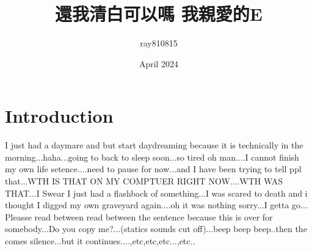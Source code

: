 \documentclass{article}
\title{還我清白可以嗎 我親愛的E}
\author{ray810815 }
\date{April 2024}
\begin{document}
\maketitle

\section{Introduction}
I just had a daymare and but start daydreaming because it is technically in the morning...haha...going to back to sleep soon...so tired oh man....I cannot finish my own life setence....need to pause for now...and I have been trying to tell
ppl that...WTH IS THAT ON MY COMPTUER RIGHT NOW....WTH WAS THAT...I Swear I just had a flashback of something...I was scared to death and i thought I digged my own graveyard  again....oh it was nothing sorry...I getta go...
Pleasse read between read between the sentence because this is over for somebody...Do you copy me?...(statics sounds cut off)...beep beep beep..then the comes silence...but it continues....,etc,etc,etc...,etc..
\end{document}
